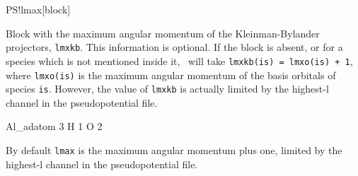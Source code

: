 \begin{fdfentry}{PS!lmax}[block]

  Block with the maximum angular momentum of the Kleinman-Bylander
  projectors, \texttt{lmxkb}.
  This information is optional. If the block is absent, or for a
  species which is not mentioned inside it, \siesta\ will take
  \texttt{lmxkb(is) = lmxo(is) + 1}, where \texttt{lmxo(is)} is the
  maximum angular momentum of the basis orbitals of species
  \texttt{is}.
However, the value of \texttt{lmxkb} is actually
limited by the highest-l channel in the pseudopotential file.
  \begin{fdfexample}
          Al_adatom   3
          H           1
          O           2
  \end{fdfexample}
  
By default \texttt{lmax} is the maximum angular momentum plus one,
limited by the highest-l channel
in the pseudopotential file.
\end{fdfentry}


